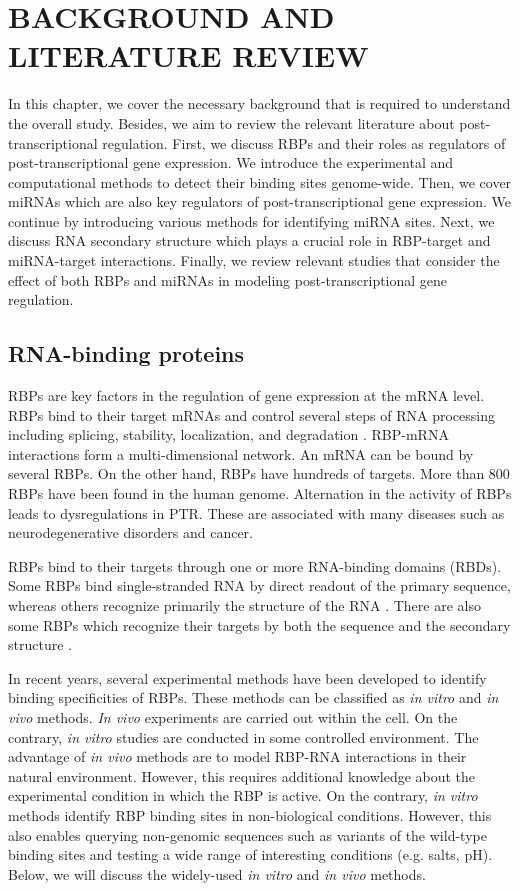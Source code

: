 \chapter{BACKGROUND AND LITERATURE REVIEW}
\label{chp:chapter2}

In this chapter, we cover the necessary background that is required to understand the overall study. Besides, we aim to review the relevant literature about post-transcriptional regulation. First, we discuss RBPs and their roles as regulators of post-transcriptional gene expression. We introduce the experimental and computational methods to detect their binding sites genome-wide. Then, we cover miRNAs which are also key regulators of post-transcriptional gene expression. We continue by introducing various methods for identifying miRNA sites. Next, we discuss RNA secondary structure which plays a crucial role in RBP-target and miRNA-target interactions. Finally, we review relevant studies that consider the effect of both RBPs and miRNAs in modeling post-transcriptional gene regulation.


\section{RNA-binding proteins}

RBPs are key factors in the regulation of gene expression at the mRNA level. RBPs bind to their target mRNAs and control several steps of RNA processing including splicing, stability, localization, and degradation \cite{dreyfuss_2002}. RBP-mRNA interactions form a multi-dimensional network. An mRNA can be bound by several RBPs. On the other hand, RBPs have hundreds of targets. More than 800 RBPs have been found in the human genome. Alternation in the activity of RBPs leads to dysregulations in PTR. These are associated with many diseases such as neurodegenerative disorders and cancer.

RBPs bind to their targets through one or more RNA-binding domains (RBDs). Some RBPs bind single-stranded RNA by direct readout of the primary sequence, whereas others recognize primarily the structure of the RNA \cite{drapper_99, zhu_2009}. There are also some RBPs which recognize their targets by both the sequence and the secondary structure \cite {johnson_2006}.

In recent years, several experimental methods have been developed to identify binding specificities of RBPs. These methods can be classified as \textit{in vitro} and \textit{in vivo} methods. \textit{In vivo} experiments are carried out within the cell. On the contrary, \textit{in vitro} studies are conducted in some controlled environment. The advantage of \textit{in vivo} methods are to model RBP-RNA interactions in their natural environment. However, this requires additional knowledge about the experimental condition in which the RBP is active. On the contrary, \textit{in vitro} methods identify RBP binding sites in non-biological conditions. However, this also enables querying non-genomic sequences such as variants of the wild-type binding sites and testing a wide range of interesting conditions (e.g. salts, pH). Below, we will discuss the widely-used \textit{in vitro} and \textit{in vivo} methods.

